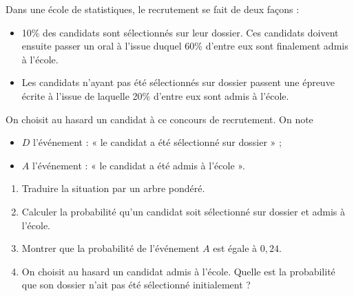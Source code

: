 \documentclass[11pt,fleqn, openany]{book} %
\begin{document}
\begin{exercise}[topic=prob01, subtitle={(Métropole 2021)}]

Dans une école de statistiques, le recrutement se fait de deux façons : 
\begin{itemize}
\item 10\% des candidats sont sélectionnés sur leur dossier. Ces candidats doivent ensuite passer un oral à l'issue duquel 60\% d'entre eux sont finalement admis à l'école.
\item Les candidats n'ayant pas été sélectionnés sur dossier passent une épreuve écrite à l'issue de laquelle 20\% d'entre eux sont admis à l'école.
\end{itemize}
On choisit au hasard un candidat à ce concours de recrutement. On note
\begin{itemize}
\item $D$ l'événement : « le candidat a été sélectionné sur dossier » ;
\item $A$ l'événement : « le candidat a été admis à l'école ».
\end{itemize}
\begin{enumerate}
\item Traduire la situation par un arbre pondéré.
\item Calculer la probabilité qu'un candidat soit sélectionné sur dossier et admis à l'école.
\item Montrer que la probabilité de l'événement $A$ est égale à $0,24$.
\item On choisit au hasard un candidat admis à l'école. Quelle est la probabilité que son dossier n'ait pas été sélectionné initialement ?
\end{enumerate}\end{exercise}
\end{document}
